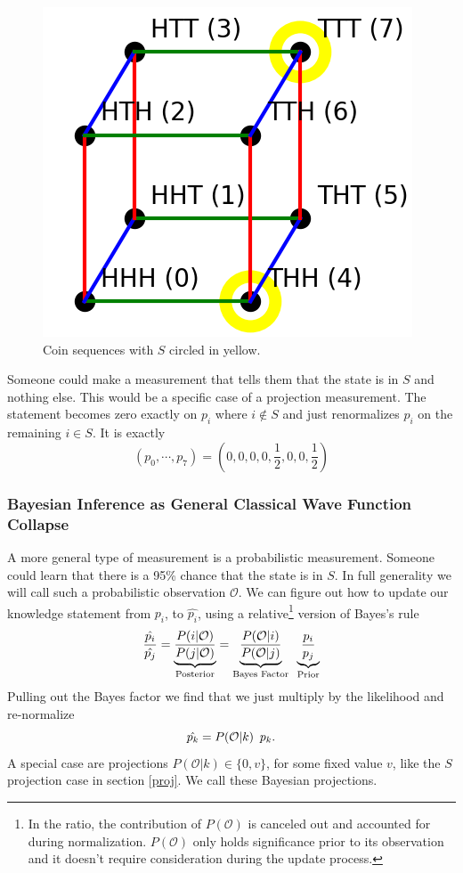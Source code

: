 \documentclass[12pt,a4paper]{article}
\theoremstyle{myrule}
\begin{document}
\begin{figure}[h]
\centering
\includegraphics[scale=0.6]{cube.png}
\caption{Coin sequences with $S$ circled in yellow.}
\label{masslessshell}
\end{figure}

Someone could make a measurement that tells them that the state is in $S$ and nothing else.  This would be a specific case of a projection measurement.  The statement becomes zero exactly on $p_i$ where $i \not \in S$ and just renormalizes $p_i$ on the remaining $i \in S$.  It is exactly
\begin{equation}
\label{sdist}
(p_0,\cdots,p_7) = \left(0,0,0,0,\frac{1}{2},0,0,\frac{1}{2}\right)
\end{equation}
\subsubsection{Bayesian Inference as General Classical Wave Function Collapse}
A more general type of measurement is a probabilistic measurement.  Someone could learn that there is a 95\% chance that the state is in $S$.  In full generality we will call such a probabilistic observation $\mathcal{O}$.  We can figure out how to update our knowledge statement from $p_i$, to $\hat{p_i}$, using a relative\footnote{In the ratio, the contribution of $P(\mathcal{O})$ is canceled out and accounted for during normalization.  $P(\mathcal{O})$ only holds significance prior to its observation and it doesn't require consideration during the update process.} version of Bayes's rule
\[
  \frac{\hat{p_i}}{\hat{p_j}} = \underbrace{\frac{P(i | \mathcal{O})}{P(j | \mathcal{O})}}_\text{Posterior}
                              = \underbrace{\frac{P(\mathcal{O} | i)}{P(\mathcal{O}|j)}}_\text{Bayes Factor}  \hspace{0.07 in}  \underbrace{\frac{p_i}{p_j}}_\text{Prior}
\]
Pulling out the Bayes factor we find that we just multiply by the likelihood and re-normalize
\[
  \hat{p_k} =  P(\mathcal{O} | k) \hspace{0.07 in} p_k.
\]
A special case are projections $P(\mathcal{O} | k) \in \{0,v\}$, for some fixed value $v$, like the $S$ projection case in section \ref{proj}.  We call these Bayesian projections.
\end{document}
